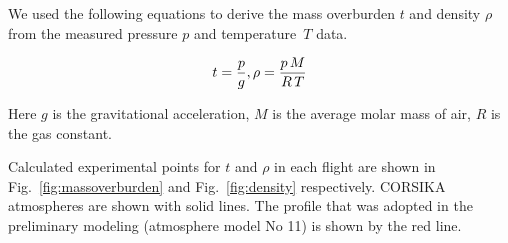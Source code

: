 \documentclass[final,5p,times,twocolumn]{elsarticle}
\begin{document}
We used the following equations to derive the mass overburden $t$ and density $\rho$ from the measured pressure $p$ and temperature~$T$ data.

\begin{equation}
t     = \frac{p}{g}, \\
\rho  = \frac{p \, M}{R \, T} \\
\end{equation}

Here $g$ is the gravitational acceleration, $M$ is the average molar mass of air, $R$ is the gas constant.

Calculated experimental points for $t$ and $\rho$ in each flight are shown in Fig.~\ref{fig:massoverburden} and Fig.~\ref{fig:density} respectively. CORSIKA atmospheres are shown with solid lines. The profile that was adopted in the preliminary modeling (atmosphere model No 11) is shown by the red line.
\end{document}
